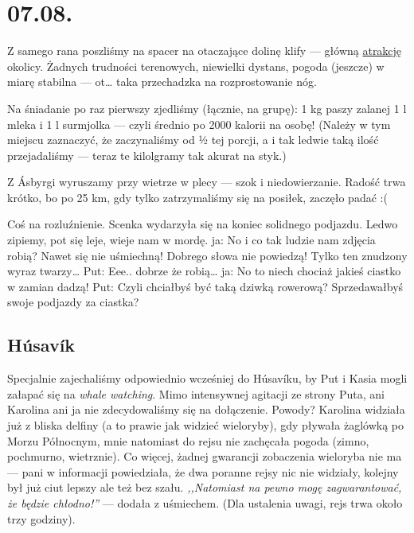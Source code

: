 \chapter*{07.08.}

Z samego rana poszliśmy na spacer na otaczające dolinę klify --- główną \href{http://www.visithusavik.com/attractions/asbyrgi-canyon/}{atrakcję} okolicy. Żadnych trudności terenowych, niewielki dystans, pogoda (jeszcze) w miarę stabilna --- ot… taka przechadzka na rozprostowanie nóg.

Na śniadanie po raz pierwszy zjedliśmy (łącznie, na grupę): 1 kg paszy zalanej 1 l mleka i 1 l surmjolka --- czyli średnio po 2000 kalorii na osobę! (Należy w tym miejscu zaznaczyć, że zaczynaliśmy od ½ tej porcji, a i tak ledwie taką ilość przejadaliśmy --- teraz te kilolgramy tak akurat na styk.)


Z Ásbyrgi wyruszamy przy wietrze w plecy --- szok i niedowierzanie. Radość trwa krótko, bo po 25 km, gdy tylko zatrzymaliśmy się na posiłek, zaczęło padać :(

Coś na rozluźnienie. Scenka wydarzyła się na koniec solidnego podjazdu. Ledwo zipiemy, pot się leje, wieje nam w mordę.
ja: No i co tak ludzie nam zdjęcia robią? Nawet się nie uśmiechną! Dobrego słowa nie powiedzą! Tylko ten znudzony wyraz twarzy…
Put: Eee.. dobrze że robią…
ja: No to niech chociaż jakieś ciastko w zamian dadzą!
Put: Czyli chciałbyś być taką dziwką rowerową? Sprzedawałbyś swoje podjazdy za ciastka?

\section*{Húsavík}

Specjalnie zajechaliśmy odpowiednio wcześniej do Húsavíku, by Put i Kasia mogli załapać się na \emph{whale watching}. Mimo intensywnej agitacji ze strony Puta, ani Karolina ani ja nie zdecydowaliśmy się na dołączenie. Powody? Karolina widziała już z bliska delfiny (a to prawie jak widzieć wieloryby), gdy pływała żaglówką po Morzu Północnym, mnie natomiast do rejsu nie zachęcała pogoda (zimno, pochmurno, wietrznie). Co więcej, żadnej gwarancji zobaczenia wieloryba nie ma --- pani w informacji powiedziała, że dwa poranne rejsy nic nie widziały, kolejny był już ciut lepszy ale też bez szału. \emph{,,Natomiast na pewno mogę zagwarantować, że będzie chłodno!''} --- dodała z uśmiechem. (Dla ustalenia uwagi, rejs trwa około trzy godziny).

